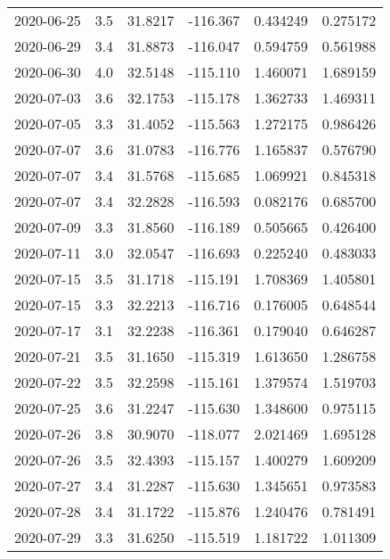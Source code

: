 \begin{tabular}{lrrrrr}
2020-06-25 &       3.5 &  31.8217 &  -116.367 &         0.434249 &         0.275172 \\
2020-06-29 &       3.4 &  31.8873 &  -116.047 &         0.594759 &         0.561988 \\
2020-06-30 &       4.0 &  32.5148 &  -115.110 &         1.460071 &         1.689159 \\
2020-07-03 &       3.6 &  32.1753 &  -115.178 &         1.362733 &         1.469311 \\
2020-07-05 &       3.3 &  31.4052 &  -115.563 &         1.272175 &         0.986426 \\
2020-07-07 &       3.6 &  31.0783 &  -116.776 &         1.165837 &         0.576790 \\
2020-07-07 &       3.4 &  31.5768 &  -115.685 &         1.069921 &         0.845318 \\
2020-07-07 &       3.4 &  32.2828 &  -116.593 &         0.082176 &         0.685700 \\
2020-07-09 &       3.3 &  31.8560 &  -116.189 &         0.505665 &         0.426400 \\
2020-07-11 &       3.0 &  32.0547 &  -116.693 &         0.225240 &         0.483033 \\
2020-07-15 &       3.5 &  31.1718 &  -115.191 &         1.708369 &         1.405801 \\
2020-07-15 &       3.3 &  32.2213 &  -116.716 &         0.176005 &         0.648544 \\
2020-07-17 &       3.1 &  32.2238 &  -116.361 &         0.179040 &         0.646287 \\
2020-07-21 &       3.5 &  31.1650 &  -115.319 &         1.613650 &         1.286758 \\
2020-07-22 &       3.5 &  32.2598 &  -115.161 &         1.379574 &         1.519703 \\
2020-07-25 &       3.6 &  31.2247 &  -115.630 &         1.348600 &         0.975115 \\
2020-07-26 &       3.8 &  30.9070 &  -118.077 &         2.021469 &         1.695128 \\
2020-07-26 &       3.5 &  32.4393 &  -115.157 &         1.400279 &         1.609209 \\
2020-07-27 &       3.4 &  31.2287 &  -115.630 &         1.345651 &         0.973583 \\
2020-07-28 &       3.4 &  31.1722 &  -115.876 &         1.240476 &         0.781491 \\
2020-07-29 &       3.3 &  31.6250 &  -115.519 &         1.181722 &         1.011309 \\

\end{tabular}
